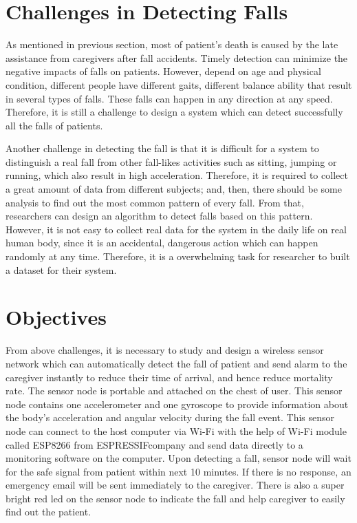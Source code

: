\documentclass[letterpaper,12pt,titlepage,oneside,final]{book}
\begin{document}
\section{Challenges in Detecting Falls}
As mentioned in previous section, most of patient's death is caused by the late assistance from caregivers after fall accidents. Timely detection can minimize the negative impacts of falls on patients. However, depend on age and physical condition, different people have different gaits, different balance ability that result in several types of falls. These falls can happen in any direction at any speed. Therefore, it is still a challenge to design a system which can detect successfully all the falls of patients. \par
Another challenge in detecting the fall is that it is difficult for a system to distinguish a real fall from other fall-likes activities such as sitting, jumping or running, which also result in high acceleration. Therefore, it is required to collect a great amount of data from different subjects; and, then, there should be some analysis to find out the most common pattern of every fall. From that, researchers can design an algorithm to detect falls based on this pattern. However, it is not easy to collect real data for the system in the daily life on real human body, since it is an accidental, dangerous action which can happen randomly at any time. Therefore, it is a overwhelming task for researcher to built a dataset for their system. 

\section{Objectives}
From above challenges, it is necessary to study and design a wireless sensor network which can automatically detect the fall of patient and send alarm to the caregiver instantly to reduce their time of arrival, and hence reduce mortality rate. The sensor node is portable and attached on the chest of user. This sensor node contains one accelerometer and one gyroscope to provide information about the body's acceleration and angular velocity during the fall event. This sensor node can connect to the host computer via Wi-Fi with the help of Wi-Fi module called ESP8266 from ESPRESSIF\textregistered company and send data directly to a monitoring software on the computer. Upon detecting a fall, sensor node will wait for the safe signal from patient within next 10 minutes. If there is no response, an emergency email will be sent immediately to the caregiver. There is also a super bright red led on the sensor node to indicate the fall and help caregiver to easily find out the patient. 
\end{document}
